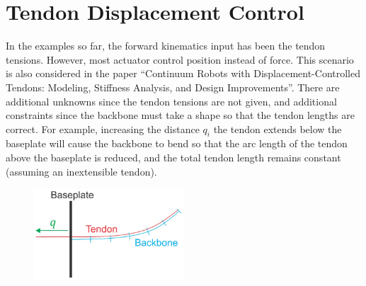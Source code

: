 \documentclass[12pt]{article}
\begin{document}
\section{Tendon Displacement Control}

In the examples so far, the forward kinematics input has been the tendon tensions. However, most actuator control position instead of force. This scenario is also considered in the paper ``Continuum Robots with Displacement-Controlled Tendons: Modeling, Stiffness Analysis, and Design Improvements''. There are additional unknowns since the tendon tensions are not given, and additional constraints since the backbone must take a shape so that the tendon lengths are correct. For example, increasing the distance $q_i$ the tendon extends below the baseplate will cause the backbone to bend so that the arc length of the tendon above the baseplate is reduced, and the total tendon length remains constant (assuming an inextensible tendon).

\begin{figure}[h]
	\centering
		\includegraphics[width=0.5\textwidth]{fig/DisplacementControl.jpg}
\end{figure}
\end{document}
